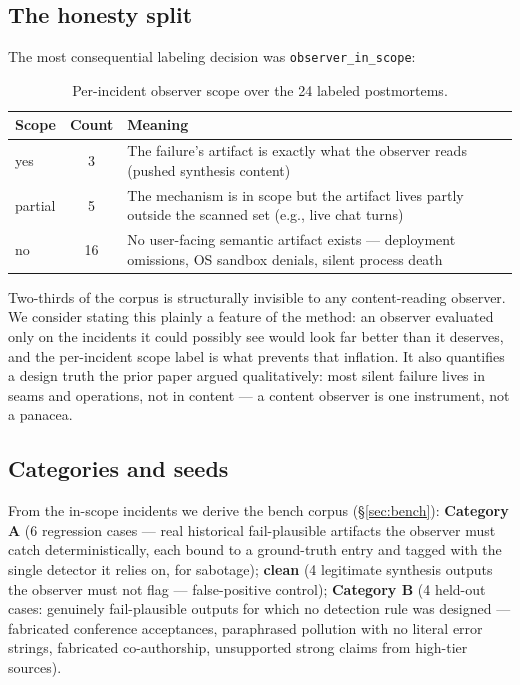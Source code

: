 \documentclass[11pt]{article}
\begin{document}
\subsection{The honesty split}
\label{sec:scope}

The most consequential labeling decision was
\texttt{observer\_in\_scope}:

\begin{table}[h]
\centering\small
\begin{tabular}{@{}lcp{9.2cm}@{}}
\toprule
\textbf{Scope} & \textbf{Count} & \textbf{Meaning} \\
\midrule
yes & 3 & The failure's artifact is exactly what the observer reads
(pushed synthesis content) \\
partial & 5 & The mechanism is in scope but the artifact lives partly
outside the scanned set (e.g., live chat turns) \\
no & 16 & No user-facing semantic artifact exists --- deployment
omissions, OS sandbox denials, silent process death \\
\bottomrule
\end{tabular}
\caption{Per-incident observer scope over the 24 labeled postmortems.}
\label{tab:scope}
\end{table}

Two-thirds of the corpus is structurally invisible to any
content-reading observer. We consider stating this plainly a feature of
the method: an observer evaluated only on the incidents it could
possibly see would look far better than it deserves, and the
per-incident scope label is what prevents that inflation. It also
quantifies a design truth the prior paper argued qualitatively: most
silent failure lives in seams and operations, not in content --- a
content observer is one instrument, not a panacea.

\subsection{Categories and seeds}

From the in-scope incidents we derive the bench corpus
(\S\ref{sec:bench}): \textbf{Category A} (6 regression cases --- real
historical fail-plausible artifacts the observer must catch
deterministically, each bound to a ground-truth entry and tagged with
the single detector it relies on, for sabotage); \textbf{clean} (4
legitimate synthesis outputs the observer must not flag ---
false-positive control); \textbf{Category B} (4 held-out cases:
genuinely fail-plausible outputs for which no detection rule was
designed --- fabricated conference acceptances, paraphrased pollution
with no literal error strings, fabricated co-authorship, unsupported
strong claims from high-tier sources).
\end{document}
